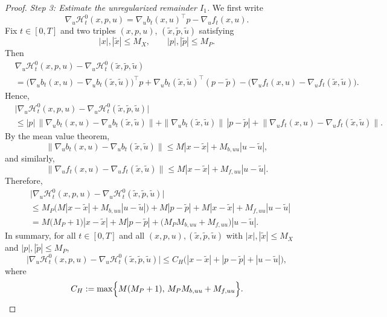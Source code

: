 \documentclass[11pt]{amsart}
\theoremstyle{plain}
\theoremstyle{definition}
\theoremstyle{remark}
\begin{document}
\begin{proof}
\smallskip

\noindent
\textit{Step 3: Estimate the unregularized remainder $I_1$.}
We first write
\[
\nabla_u \mathcal H_t^0(x,p,u)
=
\nabla_u b_t(x,u)^\top p - \nabla_u f_t(x,u).
\]
Fix $t\in[0,T]$ and two triples $(x,p,u)$, $(\tilde x,\tilde p,\tilde u)$ satisfying
\[
|x|,|\tilde x|\le M_X,
\qquad
|p|,|\tilde p|\le M_P.
\]
Then
\[
\begin{aligned}
&\nabla_u \mathcal H_t^0(x,p,u)-\nabla_u \mathcal H_t^0(\tilde x,\tilde p,\tilde u) \\
&=
\bigl(\nabla_u b_t(x,u)-\nabla_u b_t(\tilde x,\tilde u)\bigr)^\top p
+\nabla_u b_t(\tilde x,\tilde u)^\top (p-\tilde p)
-\bigl(\nabla_u f_t(x,u)-\nabla_u f_t(\tilde x,\tilde u)\bigr).
\end{aligned}
\]
Hence,
\[
\begin{aligned}
&\bigl|
\nabla_u \mathcal H_t^0(x,p,u)-\nabla_u \mathcal H_t^0(\tilde x,\tilde p,\tilde u)
\bigr| \\
&\le
|p|\,
\bigl\|\nabla_u b_t(x,u)-\nabla_u b_t(\tilde x,\tilde u)\bigr\|
+
\|\nabla_u b_t(\tilde x,\tilde u)\| \,|p-\tilde p|
+
\bigl\|\nabla_u f_t(x,u)-\nabla_u f_t(\tilde x,\tilde u)\bigr\|.
\end{aligned}
\]
By the mean value theorem,
\[
\bigl\|\nabla_u b_t(x,u)-\nabla_u b_t(\tilde x,\tilde u)\bigr\|
\le
M|x-\tilde x|+M_{b,uu}|u-\tilde u|,
\]
and similarly,
\[
\bigl\|\nabla_u f_t(x,u)-\nabla_u f_t(\tilde x,\tilde u)\bigr\|
\le
M|x-\tilde x|+M_{f,uu}|u-\tilde u|.
\]
Therefore,
\[
\begin{aligned}
&\bigl|
\nabla_u \mathcal H_t^0(x,p,u)-\nabla_u \mathcal H_t^0(\tilde x,\tilde p,\tilde u)
\bigr| \\
&\le
M_P\bigl(M|x-\tilde x|+M_{b,uu}|u-\tilde u|\bigr)
+
M|p-\tilde p|
+
M|x-\tilde x|+M_{f,uu}|u-\tilde u| \\
&=
M \bigl(M_P +1\bigr)|x-\tilde x|
+
M|p-\tilde p|
+
\bigl(M_P M_{b,uu}+M_{f,uu}\bigr)|u-\tilde u|.
\end{aligned}
\]
In summary, for all $t\in[0,T]$ and all
$(x,p,u),(\tilde x,\tilde p,\tilde u)$ with $|x|,|\tilde x|\le M_X$ and $|p|,|\tilde p|\le M_P$,
\begin{equation}\label{eq:H-grad-Lip}
\bigl|
\nabla_u \mathcal H_t^0(x,p,u)-\nabla_u \mathcal H_t^0(\tilde x,\tilde p,\tilde u)
\bigr|
\le
C_H\bigl(|x-\tilde x|+|p-\tilde p|+|u-\tilde u|\bigr),
\end{equation}
where
\[
C_H
:=
\max\Bigl\{
M(M_P+1),
\,
M_P M_{b,uu}+M_{f,uu}
\Bigr\}.
\]


\end{proof}
\end{document}
